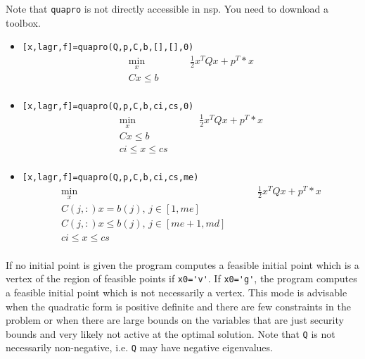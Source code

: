 \begin{mandescription}

Note that \verb!quapro! is not directly accessible in nsp. You need 
to download a toolbox.

\begin{itemize}
\item \verb![x,lagr,f]=quapro(Q,p,C,b,[],[],0)!
\begin{equation*}
\begin{split}
  \min_{x}& \hspace{1cm}  \frac{1}{2} x^T Q x + p^T *x \\
  C x \le b  & \\
\end{split}
\end{equation*}
\item  \verb![x,lagr,f]=quapro(Q,p,C,b,ci,cs,0)!
\begin{equation*}
\begin{split}
  \min_{x} &\hspace{1cm}  \frac{1}{2} x^T Q x + p^T *x \\
  C x \le b  & \\
  ci \le x \le cs & \\
\end{split}
\end{equation*}
\item \verb![x,lagr,f]=quapro(Q,p,C,b,ci,cs,me)!
\begin{equation*}
\begin{split}
  \min_{x} &\hspace{1cm}  \frac{1}{2} x^T Q x + p^T *x \\
  C(j,:) x = b(j) , \,  j \in [1,me] & \\
  C(j,:) x \le b(j), \, j \in [me+1,md] & \\
  ci \le x \le cs &\\
\end{split}
\end{equation*}
\end{itemize}
  If no initial point is given the
  program computes a feasible initial point
  which is a vertex of the region of feasible points if
  \verb!x0='v'!.
  If \verb!x0='g'!, the program computes a feasible initial 
  point which is not necessarily a vertex. This mode is
  advisable when the quadratic form is positive
  definite and there are  few constraints in
  the problem or when there are large bounds
  on the variables that are just security bounds and
  very likely not active at the optimal solution.
  Note that \verb!Q! is not necessarily non-negative, i.e.
  \verb!Q! may have negative eigenvalues.
\end{mandescription}
